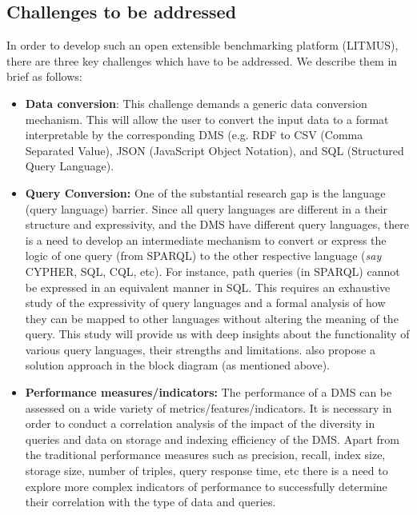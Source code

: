\documentclass{llncs}
\begin{document}
    \subsection{Challenges to be addressed}\label{challenges}
        In order to develop such an open extensible benchmarking platform (LITMUS), there are three key challenges which have to be addressed. We describe them in brief as follows:
        \begin{itemize}[nosep]
            \item {} \textbf{Data conversion}: This challenge demands a generic data conversion mechanism. This will allow the user to convert the input data to a format interpretable by the corresponding DMS (e.g. RDF to CSV (Comma Separated Value), JSON (JavaScript Object Notation),  and SQL (Structured Query Language).
            \item {} \textbf{Query Conversion:} 
            One of the substantial research gap is the language (query language) barrier. Since all query languages are different in a their structure and expressivity, and the DMS have different query languages, there is a need to develop an intermediate mechanism to convert or express the logic of one query (from SPARQL) to the other respective language (\textit{say} CYPHER, SQL, CQL, etc). For instance, path queries (in SPARQL) cannot be expressed in an equivalent manner in SQL. This requires an exhaustive study of the expressivity of query languages and a formal analysis of how they can be mapped to other languages without altering the meaning of the query. This study will provide us with deep insights about the functionality of various query languages, their strengths and limitations.
            also propose a solution approach in the block diagram (as mentioned above).
            \item {} \textbf{Performance measures/indicators:} 
            The performance of a DMS can be assessed on a wide variety of metrics/features/indicators. It is necessary in order to conduct a correlation analysis of the impact of the diversity in queries and data on storage and indexing efficiency of the DMS. Apart from the traditional performance measures such as precision, recall, index size, storage size, number of triples, query response time, etc there is a need to explore more complex indicators of performance to successfully determine their correlation with the type of data and queries.
        \end{itemize}
    
\end{document}
